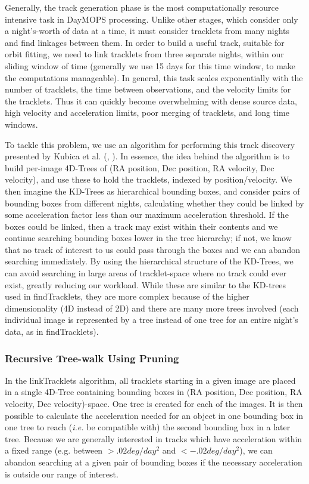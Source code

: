 Generally, the track generation phase is the most computationally
resource intensive task in DayMOPS processing. Unlike other stages,
which consider only a night's-worth of data at a time, it must
consider tracklets from many nights and find linkages between them. In
order to build a useful track, suitable for orbit fitting, we need to
link tracklets from three separate nights, within our sliding window
of time (generally we use 15 days for this time window, to make the
computations manageable). 
In general, this task scales exponentially with the number of
tracklets, the time between observations, and the velocity limits for the
tracklets. Thus it can quickly become overwhelming with dense source
data, high velocity and acceleration limits, poor merging of
tracklets, and long time windows.  

To tackle this problem, we use an algorithm for performing this track
discovery presented by Kubica et al. (\citet{kubica_thesis},
\citet{Kubica:2005:MTA:1081870.1081889}).  In essence, the idea behind
the algorithm is to build per-image 4D-Trees of (RA position, Dec
position, RA velocity, Dec velocity), and use these to hold the
tracklets, indexed by position/velocity.  We then imagine the KD-Trees
as hierarchical bounding boxes, and consider pairs of bounding boxes
from different nights, calculating whether they could be linked by
some acceleration factor less than our maximum acceleration threshold.
If the boxes could be linked, then a track may exist within their
contents and we continue searching bounding boxes lower in the tree
hierarchy; if not, we know that no track of interest to us could pass
through the boxes and we can abandon searching immediately.  By using
the hierarchical structure of the KD-Trees, we can avoid searching in
large areas of tracklet-space where no track could ever exist, greatly
reducing our workload. While these are similar to the KD-trees used in
findTracklets, they are more complex because of the higher
dimensionality (4D instead of 2D) and there are many more trees
involved (each individual image is
represented by a tree instead of one tree for an entire night's data,
as in findTracklets). 

\subsubsection{Recursive Tree-walk Using Pruning}
\label{searchPruning}

In the linkTracklets algorithm, all tracklets starting in a given
image are placed in a single 4D-Tree containing bounding boxes in (RA
position, Dec position, RA velocity, Dec velocity)-space.  One tree is
created for each of the images. It is then possible to calculate the
acceleration needed for an object in one bounding box in one tree to
reach ({\it i.e.} be compatible with) the second bounding box in a
later tree.  Because we are generally interested in tracks which have
acceleration within a fixed range (e.g. between $>.02 deg/day^2$ and
$<-.02 deg/day^2$), we can abandon searching at a given pair of
bounding boxes if the necessary acceleration is outside our range of
interest.

